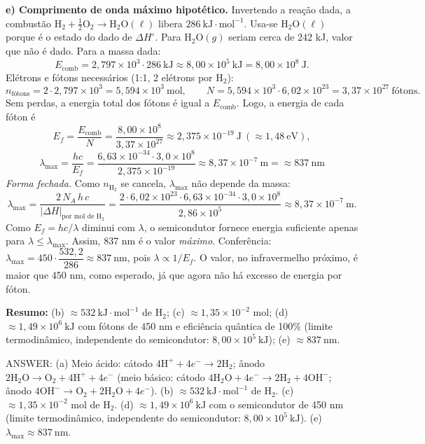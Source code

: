 \documentclass{article}%
\begin{document}
\medskip
\textbf{e) Comprimento de onda máximo hipotético.} Invertendo a reação dada, a combustão $\text{H}_2+\tfrac12\text{O}_2\rightarrow\text{H}_2\text{O}(\ell)$ libera $286\ \text{kJ}\cdot\text{mol}^{-1}$. Usa-se $\text{H}_2\text{O}(\ell)$ porque é o estado do dado de $\Delta H^\circ$. Para $\text{H}_2\text{O}(g)$ seriam cerca de 242 kJ, valor que não é dado. Para a massa dada:
\[
E_{\text{comb}}=2{,}797\times10^{3}\cdot 286\ \text{kJ}\approx 8{,}00\times10^{5}\ \text{kJ}=8{,}00\times10^{8}\ \text{J}.
\]
Elétrons e fótons necessários (1:1, 2 elétrons por $\text{H}_2$):
\[
n_{\text{fótons}}=2\cdot 2{,}797\times10^{3}=5{,}594\times10^{3}\ \text{mol},
\qquad
N=5{,}594\times10^{3}\cdot 6{,}02\times10^{23}=3{,}37\times10^{27}\ \text{fótons}.
\]
Sem perdas, a energia total dos fótons é igual a $E_{\text{comb}}$. Logo, a energia de cada fóton é
\[
E_f=\frac{E_{\text{comb}}}{N}=\frac{8{,}00\times10^{8}}{3{,}37\times10^{27}}\approx 2{,}375\times10^{-19}\ \text{J}\ (\approx1{,}48\ \text{eV}),
\]
\[
\lambda_{\max}=\frac{hc}{E_f}=\frac{6{,}63\times10^{-34}\cdot3{,}0\times10^{8}}{2{,}375\times10^{-19}}\approx 8{,}37\times10^{-7}\ \text{m}=\boxed{\approx 837\ \text{nm}}
\]
\emph{Forma fechada.} Como $n_{\text{H}_2}$ se cancela, $\lambda_{\max}$ não depende da massa:
\[
\lambda_{\max}=\frac{2\,N_A\,h\,c}{|\Delta H|_{\text{por mol de }\text{H}_2}}=\frac{2\cdot 6{,}02\times10^{23}\cdot 6{,}63\times10^{-34}\cdot 3{,}0\times10^{8}}{2{,}86\times10^{5}}\approx 8{,}37\times10^{-7}\ \text{m}.
\]
Como $E_f=hc/\lambda$ diminui com $\lambda$, o semicondutor fornece energia suficiente apenas para $\lambda\le\lambda_{\max}$. Assim, 837 nm é o valor \emph{máximo}. Conferência: $\lambda_{\max}=450\cdot\dfrac{532{,}2}{286}\approx 837\ \text{nm}$, pois $\lambda\propto 1/E_f$. O valor, no infravermelho próximo, é maior que 450 nm, como esperado, já que agora não há excesso de energia por fóton.

\medskip
\textbf{Resumo:} (b) $\approx 532\ \text{kJ}\cdot\text{mol}^{-1}$ de $\text{H}_2$; (c) $\approx 1{,}35\times10^{-2}$ mol; (d) $\approx 1{,}49\times10^{6}\ \text{kJ}$ com fótons de 450 nm e eficiência quântica de 100\% (limite termodinâmico, independente do semicondutor: $8{,}00\times10^{5}\ \text{kJ}$); (e) $\approx 837\ \text{nm}$.

ANSWER: (a) Meio ácido: cátodo $4\text{H}^++4e^-\rightarrow2\text{H}_2$; ânodo $2\text{H}_2\text{O}\rightarrow\text{O}_2+4\text{H}^++4e^-$ (meio básico: cátodo $4\text{H}_2\text{O}+4e^-\rightarrow2\text{H}_2+4\text{OH}^-$; ânodo $4\text{OH}^-\rightarrow\text{O}_2+2\text{H}_2\text{O}+4e^-$). (b) $\approx 532\ \text{kJ}\cdot\text{mol}^{-1}$ de $\text{H}_2$. (c) $\approx 1{,}35\times10^{-2}$ mol de $\text{H}_2$. (d) $\approx 1{,}49\times10^{6}\ \text{kJ}$ com o semicondutor de 450 nm (limite termodinâmico, independente do semicondutor: $8{,}00\times10^{5}\ \text{kJ}$). (e) $\lambda_{\max}\approx 837\ \text{nm}$.%
\newpage%
\end{document}
